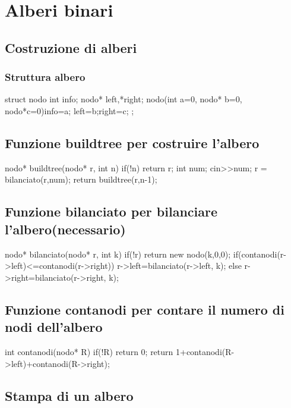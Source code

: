 \chapter{Alberi binari}
\section{Costruzione di alberi}
\subsection{Struttura albero}
\begin{codice}

struct nodo{
int info; 
nodo* left,*right; 
nodo(int a=0, nodo* b=0, nodo*c=0){info=a; left=b;right=c;}
};
\end{codice}

\section{Funzione buildtree per costruire l’albero}
\begin{codice}

nodo* buildtree(nodo* r, int n) {
if(!n) return r;
int num;
cin>>num;
r = bilanciato(r,num);
return buildtree(r,n-1);
}
\end{codice}

\section{Funzione bilanciato per bilanciare l’albero(necessario)}
\begin{codice}

nodo* bilanciato(nodo* r, int k) {
if(!r) return new nodo(k,0,0);
if(contanodi(r->left)<=contanodi(r->right)) r->left=bilanciato(r->left, k);
else r->right=bilanciato(r->right, k);
}
\end{codice}

\section{Funzione contanodi per contare il numero di nodi dell’albero}
\begin{codice}

int contanodi(nodo* R) {
if(!R) return 0;
return 1+contanodi(R->left)+contanodi(R->right);
}
\end{codice}

\section{Stampa di un albero}
